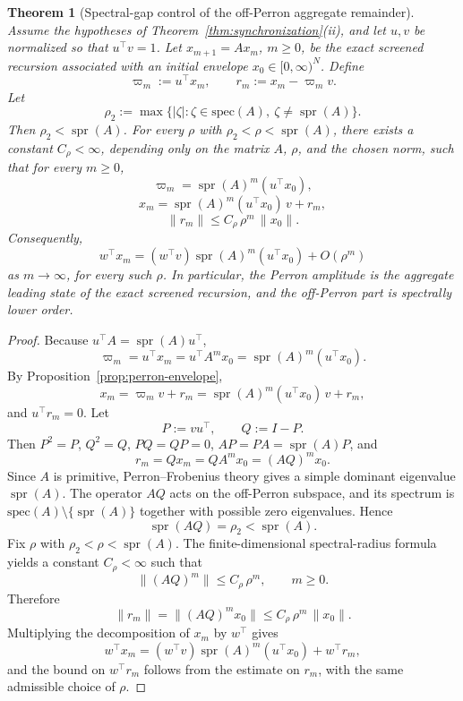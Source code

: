 \documentclass[11pt,a4paper]{amsart}
\theoremstyle{plain}
\newtheorem{theorem}{Theorem}[section]
\theoremstyle{definition}
\theoremstyle{remark}
\DeclareMathOperator{\spr}{spr}
\begin{document}
\begin{theorem}[Spectral-gap control of the off-Perron aggregate remainder]\label{thm:perron-gap}
Assume the hypotheses of Theorem~\ref{thm:synchronization}(ii), and let \(u,v\) be normalized so
that \(u^\top v=1\).  Let \(x_{m+1}=Ax_m\), \(m\ge0\), be the exact screened recursion associated
with an initial envelope \(x_0\in[0,\infty)^N\).  Define
\[
        \varpi_m:=u^\top x_m,
        \qquad
        r_m:=x_m-\varpi_m v.
\]
Let
\[
        \rho_2:=\max\{|\zeta|:\zeta\in\mathrm{spec}(A),\ \zeta\neq \spr(A)\}.
\]
Then \(\rho_2<\spr(A)\).  For every \(\rho\) with \(\rho_2<\rho<\spr(A)\), there exists a
constant \(C_\rho<\infty\), depending only on the matrix \(A\), \(\rho\), and the chosen
norm, such that for every \(m\ge0\),
\[
        \varpi_m=\spr(A)^m(u^\top x_0),
\]
\[
        x_m=\spr(A)^m(u^\top x_0)\,v+r_m,
\]
\[
        \|r_m\|\le C_\rho\,\rho^m\,\|x_0\|.
\]
Consequently,
\[
        w^\top x_m
        =
        (w^\top v)\spr(A)^m(u^\top x_0)
        +
        O(\rho^m)
\]
as \(m\to\infty\), for every such \(\rho\).  In particular, the Perron amplitude is the
aggregate leading state of the exact screened recursion, and the off-Perron part is spectrally lower
order.
\end{theorem}

\begin{proof}
Because \(u^\top A=\spr(A)u^\top\),
\[
        \varpi_m=u^\top x_m=u^\top A^m x_0=\spr(A)^m(u^\top x_0).
\]
By Proposition~\ref{prop:perron-envelope},
\[
        x_m=\varpi_m v+r_m
        =
        \spr(A)^m(u^\top x_0)\,v+r_m,
\]
and \(u^\top r_m=0\).  Let
\[
        P:=vu^\top,
        \qquad
        Q:=I-P.
\]
Then \(P^2=P\), \(Q^2=Q\), \(PQ=QP=0\), \(AP=PA=\spr(A)P\), and
\[
        r_m=Qx_m=QA^m x_0=(AQ)^m x_0.
\]
Since \(A\) is primitive, Perron--Frobenius theory gives a simple dominant eigenvalue
\(\spr(A)\).  The operator \(AQ\) acts on the off-Perron subspace, and its spectrum is
\(\mathrm{spec}(A)\setminus\{\spr(A)\}\) together with possible zero eigenvalues.  Hence
\[
        \spr(AQ)=\rho_2<\spr(A).
\]
Fix \(\rho\) with \(\rho_2<\rho<\spr(A)\).  The finite-dimensional spectral-radius formula
yields a constant \(C_\rho<\infty\) such that
\[
        \|(AQ)^m\|\le C_\rho\,\rho^m,
        \qquad
        m\ge0.
\]
Therefore
\[
        \|r_m\|
        =
        \|(AQ)^m x_0\|
        \le
        C_\rho\,\rho^m\,\|x_0\|.
\]
Multiplying the decomposition of \(x_m\) by \(w^\top\) gives
\[
        w^\top x_m
        =
        (w^\top v)\spr(A)^m(u^\top x_0)+w^\top r_m,
\]
and the bound on \(w^\top r_m\) follows from the estimate on \(r_m\), with the same admissible
choice of \(\rho\).
\end{proof}
\end{document}
